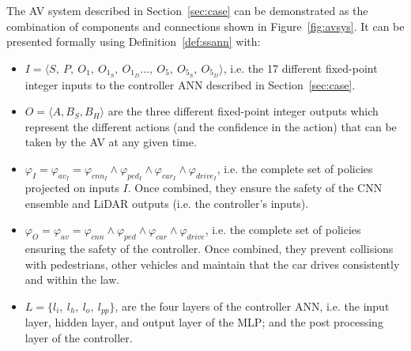 The \ac{AV} system described in Section~\ref{sec:case} can be demonstrated as the combination of components and connections shown in Figure~\ref{fig:avsys}.
It can be presented formally using Definition~\ref{def:ssann} with:
\begin{itemize}
	\item $I=\langle S,~P,~O_{1},~O_{1_S},~O_{1_D}...,~O_{5},~O_{5_S},~O_{5_D} \rangle$, i.e. the 17 different fixed-point integer inputs to the controller \ac{ANN} described in Section~\ref{sec:case}.
	\item $O = \langle A, B_S, B_H \rangle$ are the three different fixed-point integer outputs which represent the different actions (and the confidence in the action) that can be taken by the \ac{AV} at any given time.
	\item $\varphi_I = \varphi_{av_I} = \varphi_{cnn_I} \wedge \varphi_{ped_I} \wedge \varphi_{car_I} \wedge \varphi_{drive_I}$, i.e. the complete set of policies projected on inputs $I$. Once combined, they ensure the safety of the \ac{CNN} ensemble and \ac{LiDAR} outputs (i.e. the controller's inputs).
	\item $\varphi_O = \varphi_{av} = \varphi_{cnn} \wedge \varphi_{ped} \wedge \varphi_{car} \wedge \varphi_{drive}$, i.e. the complete set of policies ensuring the safety of the controller. Once combined, they prevent collisions with pedestrians, other vehicles and maintain that the car drives consistently and within the law.
	\item $L = \{l_i,~l_h,~l_o,~l_{pp}\}$, are the four layers of the controller \ac{ANN}, i.e. the input layer, hidden layer, and output layer of the \ac{MLP}; and the post processing layer of the controller.
\end{itemize}


